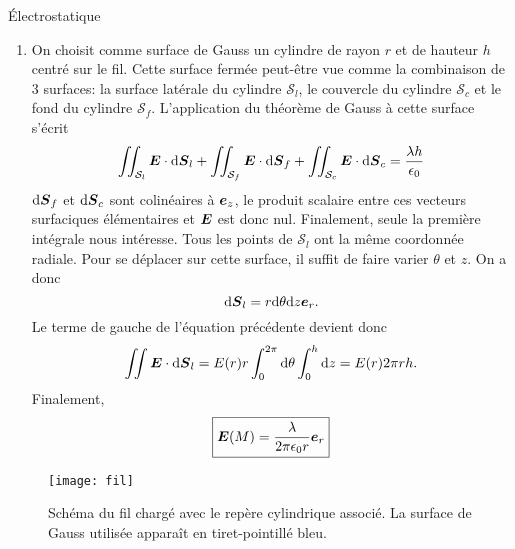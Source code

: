 \begin{corr}{Électrostatique}
\begin{enumerate}
	\item On choisit comme surface de Gauss un cylindre de rayon $r$ et de 
	  hauteur $h$ centré sur le fil. Cette surface fermée peut-être vue comme
	  la combinaison de 3 surfaces: la surface latérale du cylindre $\mathcal{S}_l$,
	  le couvercle du cylindre $\mathcal{S}_c$ et le fond du cylindre $\mathcal{S}_f$.
	  L'application du théorème de Gauss à cette surface s'écrit
	  \begin{equation*}
		  \iint_{\mathcal{S}_l} \vece \cdot \ds_l + 
		  \iint_{\mathcal{S}_f} \vece \cdot \ds_f +
	  	  \iint_{\mathcal{S}_c} \vece \cdot \ds_c =
		  \dfrac{\lambda h}{\epsilon_0}
	 \end{equation*}
	 $\ds_f$ et $\ds_c$ sont colinéaires à $\ez$, le produit scalaire
	 entre ces vecteurs surfaciques élémentaires et $\vece$ est donc nul.
	 Finalement, seule la première intégrale nous intéresse. Tous les points 
	 de $\mathcal{S}_l$ ont la même coordonnée radiale. Pour se déplacer sur cette 
	 surface, il suffit de faire varier $\theta$ et $z$. On a donc
	 \begin{equation*}
		 \ds_l = r \dtheta \dz \er.
	\end{equation*}
	Le terme de gauche de l'équation précédente devient donc
	\begin{equation*}
		\iint \vece \cdot \ds_l = E(r)r \int_0^{2\pi}\dtheta \int_0^h\dz
		= E(r) 2\pi rh.
	\end{equation*}
	Finalement, 
	\begin{equation*}
		\boxed{\vece(M) = \dfrac{\lambda}{2 \pi \epsilon_0 r}\er}
	\end{equation*}
\end{enumerate}


\begin{figure}[]
	\centering
	\texttt{[image: fil]}
	\caption{Schéma du fil chargé avec le repère cylindrique associé. 
		La surface de Gauss utilisée apparaît en tiret-pointillé bleu.}%
	\label{fig:fil}
\end{figure}
\end{corr}
